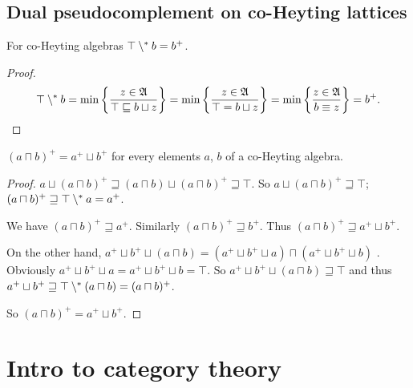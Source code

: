 \subsection{Dual pseudocomplement on co-Heyting lattices}
\begin{thm}
For co-Heyting algebras $\top\setminus^{\ast} b=b^{+}$.\end{thm}
\begin{proof}
~
\[
\top\setminus^{\ast} b=\min\left\{ \frac{z\in\mathfrak{A}}{\top\sqsubseteq b\sqcup z}\right\}=\min\left\{ \frac{z\in\mathfrak{A}}{\top=b\sqcup z}\right\}=\min\left\{ \frac{z\in\mathfrak{A}}{b\equiv z}\right\}=b^{+}.
\]
\end{proof}
\begin{thm}\label{dpdfiff-meet}
$(a\sqcap b)^{+}=a^{+}\sqcup b^{+}$ for every elements $a$, $b$
of a co-Heyting algebra.\end{thm}
\begin{proof}
$a\sqcup(a\sqcap b)^{+}\sqsupseteq(a\sqcap b)\sqcup(a\sqcap b)^{+}\sqsupseteq\top$.
So $a\sqcup(a\sqcap b)^{+}\sqsupseteq\top$; $(a\sqcap b)^{+}\sqsupseteq\top\setminus^{\ast} a=a^{+}$.

We have $(a\sqcap b)^{+}\sqsupseteq a^{+}$. Similarly $(a\sqcap b)^{+}\sqsupseteq b^{+}$.
Thus $(a\sqcap b)^{+}\sqsupseteq a^{+}\sqcup b^{+}$.

On the other hand, $a^{+}\sqcup b^{+}\sqcup(a\sqcap b)=(a^{+}\sqcup b^{+}\sqcup a)\sqcap(a^{+}\sqcup b^{+}\sqcup b)$
. Obviously $a^{+}\sqcup b^{+}\sqcup a=a^{+}\sqcup b^{+}\sqcup b=\top$.
So $a^{+}\sqcup b^{+}\sqcup(a\sqcap b)\sqsupseteq\top$ and thus $a^{+}\sqcup b^{+}\sqsupseteq\top\setminus^{\ast}(a\sqcap b)=(a\sqcap b)^{+}$.

So $(a\sqcap b)^{+}=a^{+}\sqcup b^{+}$.
\end{proof}

\section{Intro to category theory}

